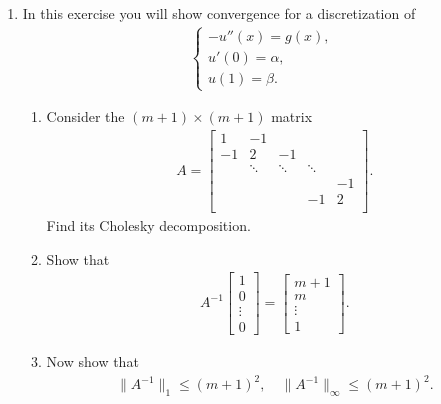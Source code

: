 \documentclass[10pt]{amsart}
\begin{document}
\mline
\begin{enumerate}[label={\bf Problem~{\arabic*}:}]
\item In this exercise you will show convergence for a discretization of
  \begin{align*}
    \begin{cases}
      -u''(x) = g(x),\\
      u'(0) = \alpha,\\
      u(1) = \beta.
    \end{cases}
  \end{align*}
  \begin{enumerate}
\item  Consider the $(m+1) \times (m+1)$ matrix
  \begin{align*}
    A = \begin{bmatrix} 1 & -1 \\ -1 & 2 &-1 \\
    & \ddots & \ddots & \ddots \\
    &&&& -1\\
    &&&-1& 2\\
  \end{bmatrix}.
    \end{align*}
    Find its Cholesky decomposition.
  \item Show that
    \begin{align}\label{unit} A^{-1} \begin{bmatrix}  1 \\ 0 \\ \vdots \\ 0 \end{bmatrix} = \begin{bmatrix}  m +1 \\ m \\ \vdots \\ 1 \end{bmatrix}.\end{align}
  \item Now show that
    \begin{align*}
      \|A^{-1}\|_1 \leq (m+1)^2, \quad \|A^{-1}\|_\infty \leq (m+1)^2.
    \end{align*}
  \end{enumerate}

\mline
  

\end{enumerate}
\end{document}

